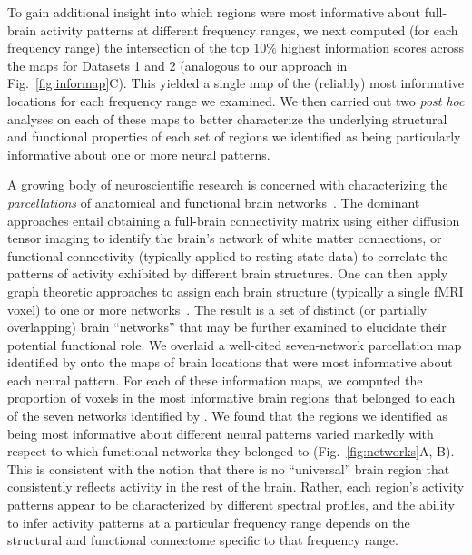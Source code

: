 \documentclass[11pt]{article}
\begin{document}
To gain additional insight into which regions were most informative about
full-brain activity patterns at different frequency ranges, we next computed (for each frequency range)
the intersection of the top 10\% highest information scores across the maps for
Datasets 1 and 2 (analogous to our approach in Fig.~\ref{fig:informap}C).
This yielded a single map of the (reliably) most informative locations for each frequency range we examined.
We then carried out two \textit{post hoc} analyses on each of these maps to better characterize
the underlying structural and functional properties of each set of regions we identified
as being particularly informative about one or more neural patterns.

A growing body of neuroscientific research is concerned with characterizing the \textit{parcellations}
of anatomical and functional brain networks~\citep[for review see][]{ZaleEtal10, ArslEtal18}.
The dominant approaches entail obtaining a full-brain connectivity matrix using either diffusion tensor imaging to identify the brain's network of
white matter connections, or functional connectivity (typically applied to resting state data) to
correlate the patterns of activity exhibited by different brain structures.  One can then apply graph theoretic approaches
to assign each brain structure (typically a single fMRI voxel) to one or more networks~\citep[for review see][]{BullSpor09}.
The result is a set of distinct (or partially overlapping) brain ``networks'' that may be
further examined to elucidate their potential functional role.  We overlaid a well-cited seven-network
parcellation map identified by \cite{YeoEtal11} onto the maps of brain locations that were most informative
about each neural pattern.  For each of these information maps, we computed the proportion of voxels in the most informative
brain regions that belonged to each of the seven networks identified by \cite{YeoEtal11}.
We found that the regions we identified as being most informative about different neural patterns varied
markedly with respect to which functional networks they belonged to (Fig.~\ref{fig:networks}A, B).  This is consistent with
the notion that there is no ``universal'' brain region that consistently reflects activity in the rest of the brain.  Rather,
each region's activity patterns appear to be characterized by different spectral profiles, and the ability to
infer activity patterns at a particular frequency range depends on the structural and functional
connectome specific to that frequency range.
\end{document}
